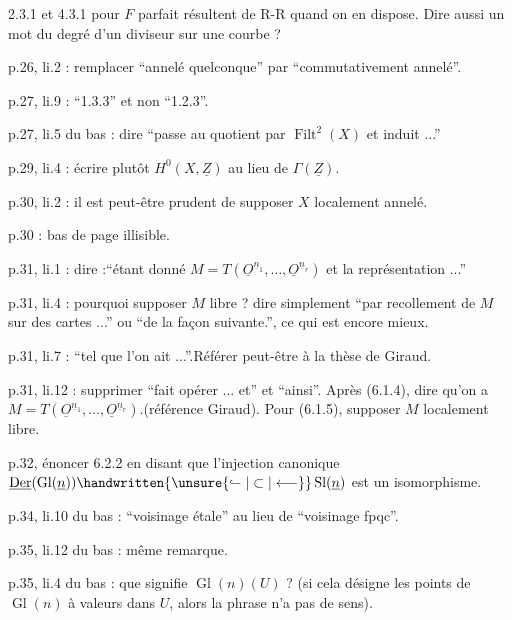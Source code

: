 2.3.1 et 4.3.1 pour $F$ parfait résultent de R-R quand on en dispose. Dire aussi un mot du degré d'un diviseur sur une courbe ?

p.26, li.2 :  remplacer ``annelé quelconque'' par ``commutativement annelé''.

p.27, li.9 : ``1.3.3'' et non ``1.2.3''.

p.27, li.5 du bas : dire ``passe au quotient par $\operatorname{Filt}^{2}(X)$ et induit ...''

p.29, li.4 : écrire plutôt $H^0(X,\underline{Z})$  au lieu de $\Gamma(\underline{Z})$.

p.30, li.2 : il est peut-être prudent de supposer $X$ localement annelé.

p.30 : bas de page illisible.

p.31, li.1 : dire :``étant donné $M=T(\underline{O}^{\underline{n}_1},\ldots,\underline{O}^{\underline{n}_r})$ et la représentation ...''

p.31, li.4 : pourquoi supposer $M$ libre ? dire simplement ``par recollement de $M$ sur des cartes ...'' ou ``de la façon suivante.'', ce qui est  encore mieux.

p.31, li.7 : ``tel que l'on ait ...''.Référer peut-être à la thèse de Giraud.

p.31, li.12 : supprimer ``fait opérer ... et'' et ``ainsi''. Après (6.1.4), dire qu'on  a $M=T(\underline{O}^{\underline{n}_1},\ldots,\underline{O}^{\underline{n}_r})$.(référence Giraud). Pour (6.1.5), supposer $M$ localement libre.

p.32,  énoncer 6.2.2 en disant que l'injection canonique $\underline{\operatorname{Der}}(\operatorname{Gl}(\underline{n}))\handwritten{\unsure{\lhook\joinrel\relbar|\subset|\longleftarrow}}\operatorname{Sl}(\underline{n})$ est un isomorphisme. 

p.34, li.10 du bas : ``voisinage étale'' au lieu de ``voisinage fpqc''.

p.35, li.12 du bas : même remarque.

p.35, li.4 du bas : que signifie $\operatorname{Gl}(n)(U)$ ? (si cela désigne les points de $\operatorname{Gl}(n)$ à valeurs dans $U$, alors la phrase n'a pas de sens).
